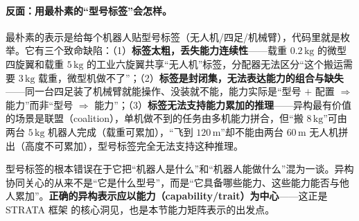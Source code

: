 \paragraph{反面：用最朴素的“型号标签”会怎样。}
最朴素的表示是给每个机器人贴型号标签（无人机/四足/机械臂），代码里就是枚举。它有三个致命缺陷：（1）\textbf{标签太粗，丢失能力连续性}——载重 $0.2\,\mathrm{kg}$ 的微型四旋翼和载重 $5\,\mathrm{kg}$ 的工业六旋翼共享“无人机”标签，分配器无法区分“这个搬运需要 $3\,\mathrm{kg}$ 载重，微型机做不了”；（2）\textbf{标签是封闭集，无法表达能力的组合与缺失}——同一台四足装了机械臂就能操作、没装就不能，能力实际是“型号 $+$ 配置 $\Rightarrow$ 能力”而非“型号 $\Rightarrow$ 能力”；（3）\textbf{标签无法支持能力累加的推理}——异构最有价值的场景是联盟（coalition），单机做不到的任务由多机能力拼合，但“搬 $8\,\mathrm{kg}$”可由两台 $5\,\mathrm{kg}$ 机器人完成（载重可累加），“飞到 $120\,\mathrm{m}$”却不能由两台 $60\,\mathrm{m}$ 无人机拼出（高度不可累加），型号标签完全无法支持这种推理。

\begin{insight}
型号标签的根本错误在于它把“机器人是什么”和“机器人能做什么”混为一谈。异构协同关心的从来不是“它是什么型号”，而是“它具备哪些能力、这些能力能否与他人累加”。\textbf{正确的异构表示应以能力（capability/trait）为中心}——这正是 STRATA 框架\cite{ravichandar2019strata} 的核心洞见，也是本节能力矩阵表示的出发点。
\end{insight}

